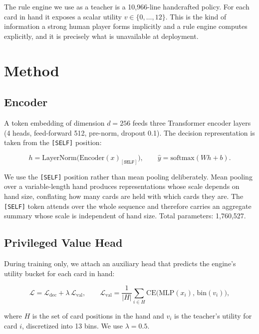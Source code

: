 \documentclass[11pt]{article}
\begin{document}
The rule engine we use as a teacher is a 10,966-line handcrafted policy. For each card in
hand it exposes a scalar utility $v \in \{0,\dots,12\}$. This is the kind of information a
strong human player forms implicitly and a rule engine computes explicitly, and it is
precisely what is unavailable at deployment.

\section{Method}
\label{sec:method}

\subsection{Encoder}

A token embedding of dimension $d=256$ feeds three Transformer encoder layers (4 heads,
feed-forward 512, pre-norm, dropout 0.1). The decision representation is taken from the
\texttt{[SELF]} position:

\begin{equation}
h = \mathrm{LayerNorm}\big(\mathrm{Encoder}(x)_{[\texttt{SELF}]}\big), \qquad
\hat{y} = \mathrm{softmax}(W h + b).
\end{equation}

We use the \texttt{[SELF]} position rather than mean pooling deliberately. Mean pooling
over a variable-length hand produces representations whose scale depends on hand size,
conflating how many cards are held with which cards they are. The \texttt{[SELF]} token
attends over the whole sequence and therefore carries an aggregate summary whose scale is
independent of hand size. Total parameters: 1,760,527.

\subsection{Privileged Value Head}

During training only, we attach an auxiliary head that predicts the engine's utility bucket
for each card in hand:

\begin{equation}
\mathcal{L} = \mathcal{L}_{\mathrm{dec}} + \lambda \, \mathcal{L}_{\mathrm{val}},
\qquad
\mathcal{L}_{\mathrm{val}} = \frac{1}{|H|}\sum_{i \in H} \mathrm{CE}\big(\mathrm{MLP}(x_i),\,
\mathrm{bin}(v_i)\big),
\end{equation}

where $H$ is the set of card positions in the hand and $v_i$ is the teacher's utility for
card $i$, discretized into 13 bins. We use $\lambda = 0.5$.
\end{document}
